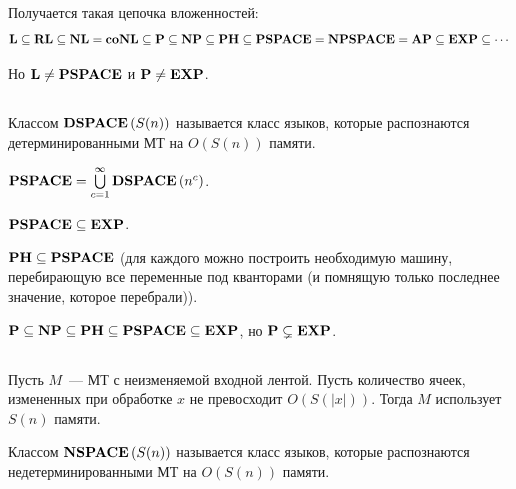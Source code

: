 \begin{note} Получается такая цепочка вложенностей:
$$
\textbf{L} \subseteq \textbf{RL} \subseteq \textbf{NL} = \textbf{coNL} \subseteq \textbf{P} \subseteq \textbf{NP} \subseteq \textbf{PH} \subseteq \textbf{PSPACE} = \textbf{NPSPACE} = \textbf{AP} \subseteq \textbf{EXP} \subseteq \cdots
$$

Но $\textbf{L} \ne \textbf{PSPACE}$ и $\textbf{P} \ne \textbf{EXP}$.
\end{note}

\subsection{\psp}

\begin{definition}
Классом $\textbf{DSPACE}\left({S(n)}\right)$ называется класс языков, которые распознаются детерминированными МТ на $O(S(n))$ памяти.
\end{definition}

\begin{definition}
$\textbf{PSPACE} = \bigcup\limits_{c = 1}^\infty \textbf{DSPACE}\left({n^c}\right)$.
\end{definition}

\begin{note}
$\textbf{PSPACE} \subseteq \textbf{EXP}$.
\end{note}

\begin{note}
$\textbf{PH} \subseteq \textbf{PSPACE}$ (для каждого  можно построить необходимую машину, перебирающую все переменные под кванторами (и помнящую только последнее значение, которое перебрали)).
\end{note}

\begin{note}
$\textbf{P} \subseteq \textbf{NP} \subseteq \textbf{PH} \subseteq \textbf{PSPACE} \subseteq \textbf{EXP}$, но $\textbf{P} \subsetneq \textbf{EXP}$.
\end{note}

\subsection{\npsp}

\begin{definition}
Пусть $M$~--- МТ с неизменяемой входной лентой. Пусть количество ячеек, измененных при обработке $x$ не превосходит $O(S(|x|))$. Тогда $M$ использует $S(n)$ памяти. 
\end{definition}

\begin{definition}
Классом $\textbf{NSPACE}\left({S(n)}\right)$ называется класс языков, которые распознаются недетерминированными МТ на $O(S(n))$ памяти.
\end{definition}


